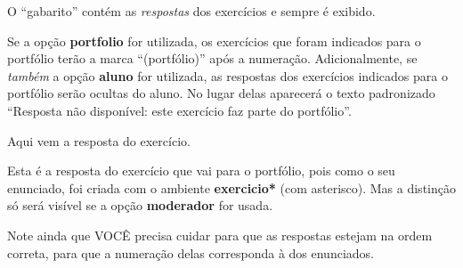\documentclass[a4paper]{article}
\newcommand\code[1]{\textbf{#1}}
\begin{document}
  \begin{respostas}
    
    O ``gabarito'' contém as \emph{respostas} dos exercícios e sempre é exibido.
    
    Se a opção \code{portfolio} for utilizada, os exercícios que foram indicados para o portfólio
    terão a marca ``(portfólio)'' após a numeração.  
    Adicionalmente, se \emph{também} a opção \code{aluno} for utilizada,
    as respostas dos exercícios indicados para o portfólio serão ocultas do aluno.
    No lugar delas aparecerá o texto padronizado
    ``Resposta não disponível: este exercício faz parte do portfólio''.

    \begin{exercicio}
      Aqui vem a resposta do exercício.
    \end{exercicio}
    
    \begin{exercicio*}
      Esta é a resposta do exercício que vai para o portfólio, pois como o seu enunciado, foi criada com o ambiente \code{exercicio*} (com asterisco).
      Mas a distinção só será visível se a opção \code{moderador} for usada.    
    \end{exercicio*}

    \begin{exercicio}
      Note ainda que VOCÊ precisa cuidar para que as respostas estejam na ordem correta,
      para que a numeração delas corresponda à dos enunciados.
    \end{exercicio}

  \end{respostas}
\end{document}
